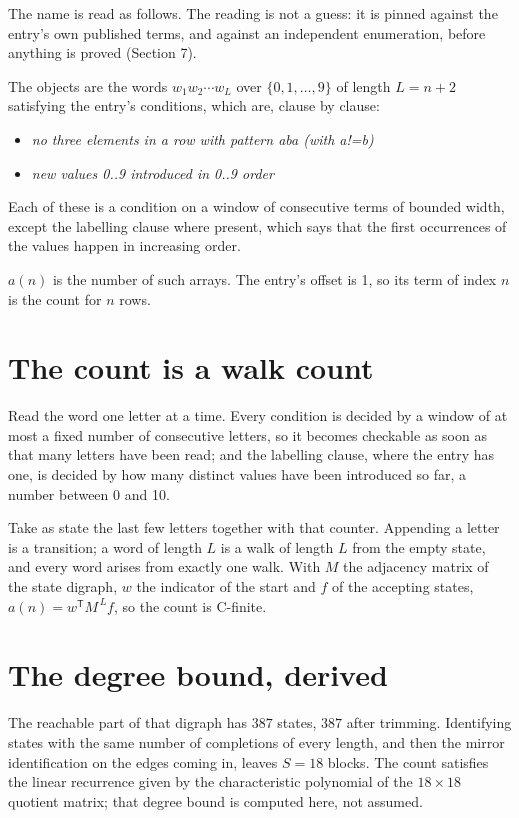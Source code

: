 \documentclass[11pt]{article}
\theoremstyle{definition}
\begin{document}
The name is read as follows. The reading is not a guess: it is pinned against the entry's own published terms, and against an independent enumeration, before anything is proved (Section 7).

The objects are the words $w_1 w_2 \cdots w_L$ over $\{0,1,\dots,9\}$ of length $L = n + 2$ satisfying the entry's conditions, which are, clause by clause:

\begin{itemize}

\item {\itshape no three elements in a row with pattern aba (with a!=b)}

\item {\itshape new values 0..9 introduced in 0..9 order}

\end{itemize}

Each of these is a condition on a window of consecutive terms of bounded width, except the labelling clause where present, which says that the first occurrences of the values happen in increasing order.

$a(n)$ is the number of such arrays. The entry's offset is 1, so its term of index $n$ is the count for $n$ rows.

\section{The count is a walk count}

Read the word one letter at a time. Every condition is decided by a window of at most a fixed number of consecutive letters, so it becomes checkable as soon as that many letters have been read; and the labelling clause, where the entry has one, is decided by how many distinct values have been introduced so far, a number between $0$ and 10.

Take as state the last few letters together with that counter. Appending a letter is a transition; a word of length $L$ is a walk of length $L$ from the empty state, and every word arises from exactly one walk. With $M$ the adjacency matrix of the state digraph, $w$ the indicator of the start and $f$ of the accepting states, $a(n) = w^{\mathsf T}M^{\,L}f$, so the count is C-finite.

\section{The degree bound, derived}

The reachable part of that digraph has $387$ states, $387$ after trimming. Identifying states with the same number of completions of every length, and then the mirror identification on the edges coming in, leaves $S = 18$ blocks. The count satisfies the linear recurrence given by the characteristic polynomial of the $18\times18$ quotient matrix; that degree bound is computed here, not assumed.
\end{document}
